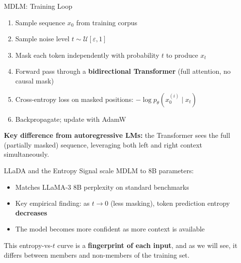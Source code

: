\documentclass[10pt, aspectratio=169]{beamer}
\begin{document}
\begin{frame}{MDLM: Training Loop}
  \begin{enumerate}
    \item Sample sequence $x_0$ from training corpus
    \item Sample noise level $t \sim \mathcal{U}[\varepsilon, 1]$
    \item Mask each token independently with probability $t$ to produce $x_t$
    \item Forward pass through a \textbf{bidirectional Transformer} (full attention, no causal mask)
    \item Cross-entropy loss on masked positions: $-\log p_\theta(x_0^{(i)} \mid x_t)$
    \item Backpropagate; update with AdamW
  \end{enumerate}
  \vspace{8pt}
  \textbf{Key difference from autoregressive LMs:} the Transformer sees the full (partially masked) sequence,
  leveraging both left and right context simultaneously.
\end{frame}

\begin{frame}{LLaDA and the Entropy Signal}
  \citet{nie2025llada} scale MDLM to 8B parameters:
  \begin{itemize}
    \item Matches LLaMA-3 8B perplexity on standard benchmarks
    \item Key empirical finding: as $t\to 0$ (less masking), token prediction entropy \textbf{decreases}
    \item The model becomes more confident as more context is available
  \end{itemize}
  \vspace{8pt}
  This entropy-vs-$t$ curve is a \textbf{fingerprint of each input}, and as we will see,
  it differs between members and non-members of the training set.
\end{frame}
\end{document}
